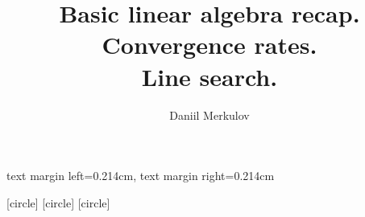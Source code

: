 
\usepackage{animate}
\usepackage{caption}
\usepackage{subcaption}
\usepackage{tikz}
\usepackage{cancel}
\usepackage{booktabs}
\usepackage{ stmaryrd }
\usepackage[export]{adjustbox}
\usepackage{fontawesome5}
\usepackage{algorithmic}
\usepackage{amsmath}
\usepackage{yfonts}
\graphicspath{{../../files/}}
\usepackage[backend=bibtex,style=numeric ,natbib=true, maxnames=10, backref=true]{biblatex}

\newcommand{\theHalgorithm}{\arabic{algorithm}}
\usepackage[ruled,vlined]{algorithm2e}
\renewcommand{\algorithmicrequire}{\textbf{Input:}}
\renewcommand{\algorithmicensure}{\textbf{Output:}}
\newcommand{\vect}[1]{\boldsymbol{\mathbf{#1}}}



\setbeamersize
{
    text margin left=0.214cm,
    text margin right=0.214cm
}

[circle] %
[circle] %
[circle] %


\usenavigationsymbolstemplate{}

\newcommand*{\Scale}[2][4]{\scalebox{#1}{$#2$}}%
\newcommand{\argmin}{\operatornamewithlimits{argmin}}
\newcommand{\argmax}{\operatornamewithlimits{argmax}}
\newcommand{\la}{\langle}
\newcommand{\ra}{\rangle}

\title{Basic linear algebra recap. Convergence rates. \\Line search.}
\author{Daniil Merkulov}
\date{}